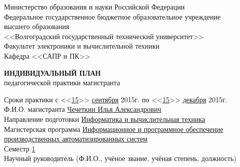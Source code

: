 \documentclass[a4paper, 14pt]{extreport}
\begin{document}
    \onehalfspacing
    \begin{titlepage}
        \begin{center}
            Министерство образования и науки Российской Федерации\\
            Федеральное государственное бюджетное образовательное учреждение\\
            высшего образования\\
            <<Волгоградский государственный технический университет>>\\
            Факультет электроники и вычислительной техники\\
            Кафедра <<САПР и ПК>>
        \end{center}
        \vspace{2cm}
        \begin{center}
            \large \textbf{ИНДИВИДУАЛЬНЫЙ ПЛАН} \\
            педагогической практики магистранта
        \end{center}
        \vspace{2cm}
        Сроки практики с <<\underline{\hspace{.7em}15\hspace{.7em}}>> \underline{\hspace{1em}сентября\hspace{1em}} 2015г. 
        по <<\underline{\hspace{.7em}15\hspace{.7em}}>> \underline{\hspace{1em}декабря\hspace{1em}} 2015г.\\
        Ф.И.О. магистранта \underline{Чечеткин Илья Александрович\hspace{10.8em}} \\
        Направление подготовки \underline{Информатика и вычислительная техника\hspace{4.5em}} \\
        Магистерская программа \underline{Информационное и программное обеспечение\hspace{2.1em}}\\
        \underline{производственных автоматизированных систем\hspace{12.9em}} \\
        Семестр \underline{\hspace{1cm}1\hspace{1cm}} \\

        \noindent Научный руководитель (Ф.И.О., учёное звание, учёная степень, должность)\\
        \underline{\hspace{\textwidth}}\\
        \underline{\hspace{\textwidth}}\\
        \underline{\hspace{\textwidth}}
    \end{titlepage}
\end{document}
